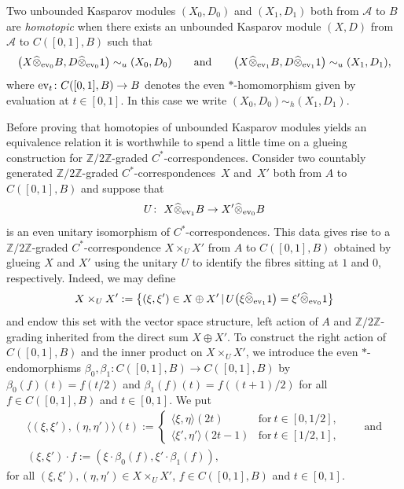 \documentclass[pdftex]{sigma}
\numberwithin{equation}{section}
\newcommand{\cd}{\cdot}
\newcommand{\hot}{\widehat \otimes}
\newcommand{\op}{\oplus}
\newcommand{\ti}{\times}
\newcommand{\zz}{\mathbb{Z}}
\newcommand{\be}{\beta}
\newcommand{\s}[1]{\mathscr{#1}}
\newcommand{\inn}[1]{\langle #1 \rangle}
\begin{document}
\begin{dfn}
Two unbounded Kasparov modules $(X_0,D_0)$ and $(X_1,D_1)$ both from $\s A$ to $B$ are \emph{homotopic} when there exists an unbounded Kasparov module $(X,D)$ from $\s A$ to $C([0,1],B)$ such that
\[
\big(X \hot_{{\rm ev}_0} B,D \hot_{{\rm ev}_0} 1\big) \sim_u (X_0,D_0) \qquad \mbox{and} \qquad \big(X \hot_{{\rm ev}_1} B,D \hot_{{\rm ev}_1} 1\big) \sim_u (X_1,D_1) ,
\]
where ${\rm ev}_t\colon C( [0,1],B) \to B$ denotes the even $*$-homomorphism given by evaluation at $t \in [0,1]$. In this case we write $(X_0,D_0) \sim_h (X_1,D_1)$.
\end{dfn}

Before proving that homotopies of unbounded Kasparov modules yields an equivalence relation it is worthwhile to spend a little time on a glueing construction for $\zz/2\zz$-graded $C^*$-correspondences. Consider two countably generated $\zz/2\zz$-graded $C^*$-correspondences~$X$ and~$X'$ both from $A$ to $C([0,1],B)$ and suppose that
\[
U\colon \ X \hot_{{\rm ev}_1} B \to X' \hot_{{\rm ev}_0} B
\]
is an even unitary isomorphism of $C^*$-correspondences. This data gives rise to a $\zz/2\zz$-graded $C^*$-correspondence $X \ti_U X'$ from $A$ to $C([0,1],B)$ obtained by glueing $X$ and $X'$ using the unitary $U$ to identify the fibres sitting at $1$ and $0$, respectively. Indeed, we may define
\[
X \ti_U X' := \big\{ (\xi,\xi') \in X \op X' \,|\, U\big( \xi \hot_{{\rm ev}_1} 1 \big) = \xi' \hot_{{\rm ev}_0} 1 \big\}
\]
and endow this set with the vector space structure, left action of $A$ and $\zz/2\zz$-grading inherited from the direct sum $X \op X'$. To construct the right action of $C([0,1],B)$ and the inner product on $X \ti_U X'$, we introduce the even $*$-endomorphisms $\be_0 , \be_1\colon C( [0,1],B) \to C([0,1],B)$ by $\be_0(f)(t) = f(t/2)$ and $\be_1(f)(t) = f( (t + 1)/2)$ for all $f \in C([0,1],B)$ and $t \in [0,1]$. We put
\begin{gather*}
\inn{ (\xi,\xi'), (\eta,\eta')}(t) :=
\begin{cases} \inn{\xi,\eta}(2t) & \text{for} \ t \in [0,1/2], \\
\inn{\xi',\eta'}(2t - 1) & \text{for} \ t \in [1/2,1],
\end{cases} \qquad \text{and} \\
(\xi,\xi') \cd f := (\xi \cd \be_0(f),\xi' \cd \be_1(f)) ,
\end{gather*}
for all $(\xi,\xi'), (\eta,\eta') \in X \ti_U X'$, $f \in C([0,1],B)$ and $t \in [0,1]$.
\end{document}
